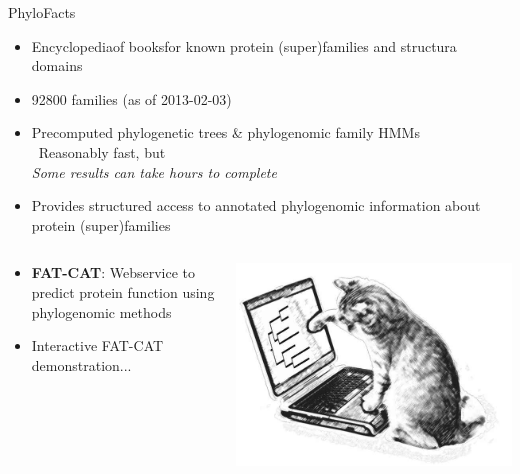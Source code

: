 \documentclass[14pt,xcolor=dvipsnames,pdftex]{beamer}
\begin{document}
\begin{frame}[allowframebreaks]{PhyloFacts}
 \begin{itemize}
  \item \glqq Encyclopedia\grqq of \glqq books\grqq for known protein (super)families and structura domains
  \item 92800 families (as of 2013-02-03)
  \item Precomputed phylogenetic trees \& phylogenomic family HMMs\\
  \textrightarrow\ Reasonably fast, but\\\glqq\textit{Some results can take hours to complete}\grqq
  \item Provides structured access to annotated phylogenomic information about protein (super)families
 \end{itemize}
 \framebreak
 \begin{columns}[T]
 
 \begin{column}{.7\textwidth}
 \begin{itemize}
  \item \textbf{FAT-CAT}: Webservice to predict protein function using phylogenomic methods
  \item Interactive FAT-CAT demonstration...
 \end{itemize}
 \end{column}
  \begin{column}{.3\textwidth}
   \includegraphics[width=1.2\textwidth]{figures/fatcat.jpg}
  \end{column}
 \end{columns}

\end{frame}
\end{document}
